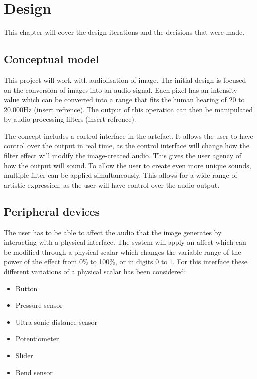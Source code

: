 \chapter{Design}\label{ch:design}
This chapter will cover the design iterations and the decisions that were made. 

\section{Conceptual model}
This project will work with audiolisation of image. The initial design is focused on the conversion of images into an audio signal. Each pixel has an intensity value which can be converted into a range that fits the human hearing of 20 to 20.000Hz (insert refrence). The output of this operation can then be manipulated by audio processing filters (insert refrence).

The concept includes a control interface in the artefact. It allows the user to have control over the output in real time, as the control interface will change how the filter effect will modify the image-created audio. This gives the user agency of how the output will sound. To allow the user to create even more unique sounds, multiple filter can be applied simultaneously. This allows for a wide range of artistic expression, as the user will have control over the audio output.

\section{Peripheral devices}
The user has to be able to affect the audio that the image generates by interacting with a physical interface. The system will apply an affect which can be modified through a physical scalar which changes the variable range of the power of the effect from 0\% to 100\%, or in digits 0 to 1. For this interface these different variations of a physical scalar has been considered: 

\begin{itemize}
\item Button
\item Pressure sensor
\item Ultra sonic distance sensor
\item Potentiometer
\item Slider
\item Bend sensor
\end{itemize}

